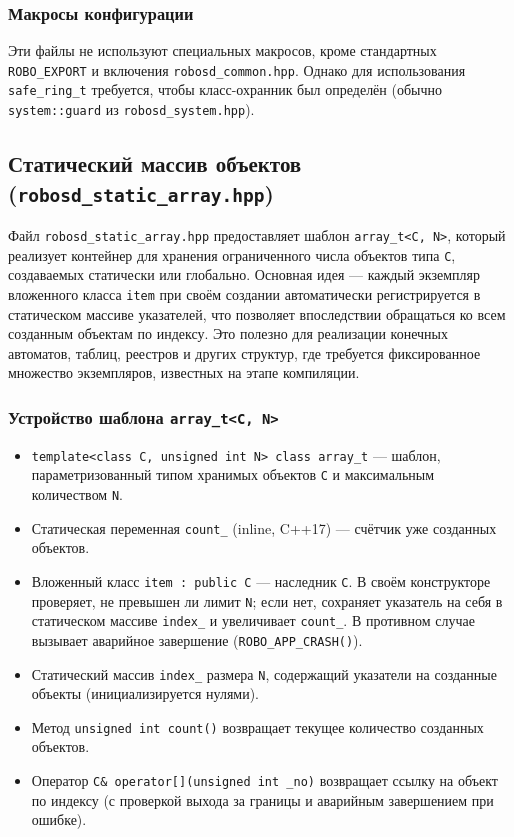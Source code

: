 \documentclass[a4paper,12pt]{article}
\begin{document}
\subsubsection{Макросы конфигурации}

Эти файлы не используют специальных макросов, кроме стандартных \texttt{ROBO\_EXPORT} и включения \texttt{robosd\_common.hpp}. Однако для использования \texttt{safe\_ring\_t} требуется, чтобы класс-охранник был определён (обычно \texttt{system::guard} из \texttt{robosd\_system.hpp}).

\subsection{Статический массив объектов (\texttt{robosd\_static\_array.hpp})}

Файл \texttt{robosd\_static\_array.hpp} предоставляет шаблон \texttt{array\_t<C, N>}, который реализует контейнер для хранения ограниченного числа объектов типа \texttt{C}, создаваемых статически или глобально. Основная идея — каждый экземпляр вложенного класса \texttt{item} при своём создании автоматически регистрируется в статическом массиве указателей, что позволяет впоследствии обращаться ко всем созданным объектам по индексу. Это полезно для реализации конечных автоматов, таблиц, реестров и других структур, где требуется фиксированное множество экземпляров, известных на этапе компиляции.

\subsubsection{Устройство шаблона \texttt{array\_t<C, N>}}

\begin{itemize}
    \item \texttt{template<class C, unsigned int N> class array\_t} — шаблон, параметризованный типом хранимых объектов \texttt{C} и максимальным количеством \texttt{N}.
    \item Статическая переменная \texttt{count\_} (inline, C++17) — счётчик уже созданных объектов.
    \item Вложенный класс \texttt{item : public C} — наследник \texttt{C}. В своём конструкторе проверяет, не превышен ли лимит \texttt{N}; если нет, сохраняет указатель на себя в статическом массиве \texttt{index\_} и увеличивает \texttt{count\_}. В противном случае вызывает аварийное завершение (\texttt{ROBO\_APP\_CRASH()}).
    \item Статический массив \texttt{index\_} размера \texttt{N}, содержащий указатели на созданные объекты (инициализируется нулями).
    \item Метод \texttt{unsigned int count()} возвращает текущее количество созданных объектов.
    \item Оператор \texttt{C\& operator[](unsigned int \_no)} возвращает ссылку на объект по индексу (с проверкой выхода за границы и аварийным завершением при ошибке).
\end{itemize}
\end{document}
